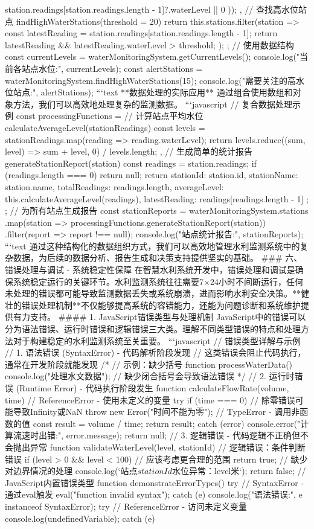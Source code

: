 {{{{station.readings[station.readings.length - 1]?.waterLevel || 0 })); }, // 查找高水位站点 findHighWaterStations(threshold = 20) { return this.stations.filter(station => { const latestReading = station.readings[station.readings.length - 1]; return latestReading && latestReading.waterLevel > threshold; }); } }; // 使用数据结构 const currentLevels = waterMonitoringSystem.getCurrentLevels(); console.log("当前各站点水位:", currentLevels); const alertStations = waterMonitoringSystem.findHighWaterStations(15); console.log("需要关注的高水位站点:", alertStations); ```text **数据处理的实际应用** 通过组合使用数组和对象方法，我们可以高效地处理复杂的监测数据。 ```javascript // 复合数据处理示例 const processingFunctions = { // 计算站点平均水位 calculateAverageLevel(stationReadings) { const levels = stationReadings.map(reading => reading.waterLevel); return levels.reduce((sum, level) => sum + level, 0) / levels.length; }, // 生成简单的统计报告 generateStationReport(station) { const readings = station.readings; if (readings.length === 0) return null; return { stationId: station.id, stationName: station.name, totalReadings: readings.length, averageLevel: this.calculateAverageLevel(readings), latestReading: readings[readings.length - 1] }; } }; // 为所有站点生成报告 const stationReports = waterMonitoringSystem.stations .map(station => processingFunctions.generateStationReport(station)) .filter(report => report !== null); console.log("站点统计报告:", stationReports); ```text 通过这种结构化的数据组织方式，我们可以高效地管理水利监测系统中的复杂数据，为后续的数据分析、报告生成和决策支持提供坚实的基础。 ### 六、错误处理与调试 - 系统稳定性保障 在智慧水利系统开发中，错误处理和调试是确保系统稳定运行的关键环节。水利监测系统往往需要7×24小时不间断运行，任何未处理的错误都可能导致监测数据丢失或系统崩溃，进而影响水利安全决策。**健壮的错误处理机制**不仅能够提高系统的容错能力，还能为问题诊断和系统维护提供有力支持。 #### 1. JavaScript错误类型与处理机制 JavaScript中的错误可以分为语法错误、运行时错误和逻辑错误三大类。理解不同类型错误的特点和处理方法对于构建稳定的水利监测系统至关重要。 ```javascript // 错误类型详解与示例 // 1. 语法错误 (SyntaxError) - 代码解析阶段发现 // 这类错误会阻止代码执行，通常在开发阶段就能发现 /* // 示例：缺少括号 function processWaterData() { console.log("处理水文数据"); // 缺少闭合括号会导致语法错误 */ // 2. 运行时错误 (Runtime Error) - 代码执行阶段发生 function calculateFlowRate(volume, time) { // ReferenceError - 使用未定义的变量 try { if (time === 0) { // 除零错误可能导致Infinity或NaN throw new Error("时间不能为零"); } // TypeError - 调用非函数的值 const result = volume / time; return result; } catch (error) { console.error("计算流速时出错:", error.message); return null; } } // 3. 逻辑错误 - 代码逻辑不正确但不会抛出异常 function validateWaterLevel(level, stationId) { // 逻辑错误：条件判断错误 if (level > 0 && level < 100) { // 应该考虑更合理的范围 return true; } // 缺少对边界情况的处理 console.log(`站点${stationId}水位异常：${level}米`); return false; } // JavaScript内置错误类型 function demonstrateErrorTypes() { try { // SyntaxError - 通过eval触发 eval("function invalid syntax"); } catch (e) { console.log("语法错误:", e instanceof SyntaxError); } try { // ReferenceError - 访问未定义变量 console.log(undefinedVariable); } catch (e) { }}}}
